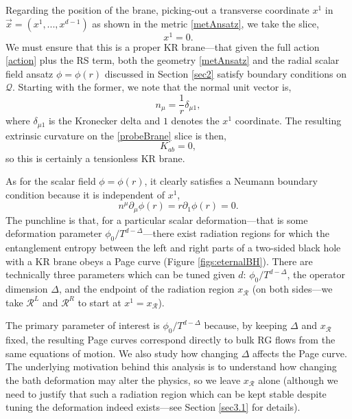 \documentclass[12pt,a4paper]{article}
\begin{document}
Regarding the position of the brane, picking-out a transverse coordinate $x^1$ in $\vec{x} = (x^1,...,x^{d-1})$ as shown in the metric \eqref{metAnsatz}, we take the slice,
\begin{equation}
x^1 = 0.\label{probeBrane}
\end{equation}
We must ensure that this is a proper KR brane---that given the full action \eqref{action} plus the RS term, both the geometry \eqref{metAnsatz} and the radial scalar field ansatz $\phi = \phi(r)$ discussed in Section \ref{sec2} satisfy boundary conditions on $\mathcal{Q}$. Starting with the former, we note that the normal unit vector is,
\begin{equation}
n_\mu = \frac{1}{r}\delta_{\mu 1},
\end{equation}
where $\delta_{\mu 1}$ is the Kronecker delta and $1$ denotes the $x^1$ coordinate. The resulting extrinsic curvature on the \eqref{probeBrane} slice is then,
\begin{equation}
K_{ab} = 0,
\end{equation}
so this is certainly a tensionless KR brane.

As for the scalar field $\phi = \phi(r)$, it clearly satisfies a Neumann boundary condition because it is independent of $x^1$,
\begin{equation}
n^\mu \partial_\mu \phi(r) = r \partial_1 \phi(r) = 0.
\end{equation}
The punchline is that, for a particular scalar deformation---that is some deformation parameter $\phi_0/T^{d-\Delta}$---there exist radiation regions for which the entanglement entropy between the left and right parts of a two-sided black hole with a KR brane obeys a Page curve (Figure \ref{figs:eternalBH}). There are technically three parameters which can be tuned given $d$: $\phi_0/T^{d-\Delta}$, the operator dimension $\Delta$, and the endpoint of the radiation region $x_\mathcal{R}$ (on both sides---we take $\mathcal{R}^L$ and $\mathcal{R}^R$ to start at $x^1 = x_\mathcal{R}$).

The primary parameter of interest is $\phi_0/T^{d-\Delta}$ because, by keeping $\Delta$ and $x_\mathcal{R}$ fixed, the resulting Page curves correspond directly to bulk RG flows from the same equations of motion. We also study how changing $\Delta$ affects the Page curve. The underlying motivation behind this analysis is to understand how changing the bath deformation may alter the physics, so we leave $x_\mathcal{R}$ alone (although we need to justify that such a radiation region which can be kept stable despite tuning the deformation indeed exists---see Section \ref{sec3.1} for details).
\end{document}
